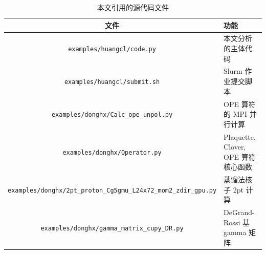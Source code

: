 \documentclass[12pt,a4paper]{ctexart}
\begin{document}
\begin{table}[H]
\centering
\caption{本文引用的源代码文件}
\begin{tabular}{c|l}
\toprule
\textbf{文件} & \textbf{功能} \\
\midrule
\texttt{examples/huangcl/code.py} & 本文分析的主体代码 \\
\texttt{examples/huangcl/submit.sh} & Slurm 作业提交脚本 \\
\texttt{examples/donghx/Calc\_ope\_unpol.py} & OPE 算符的 MPI 并行计算 \\
\texttt{examples/donghx/Operator.py} & Plaquette, Clover, OPE 算符核心函数 \\
\texttt{examples/donghx/2pt\_proton\_Cg5gmu\_L24x72\_mom2\_zdir\_gpu.py} & 蒸馏法核子 2pt 计算 \\
\texttt{examples/donghx/gamma\_matrix\_cupy\_DR.py} & DeGrand-Rossi 基 gamma 矩阵 \\
\bottomrule
\end{tabular}
\end{table}
\end{document}
